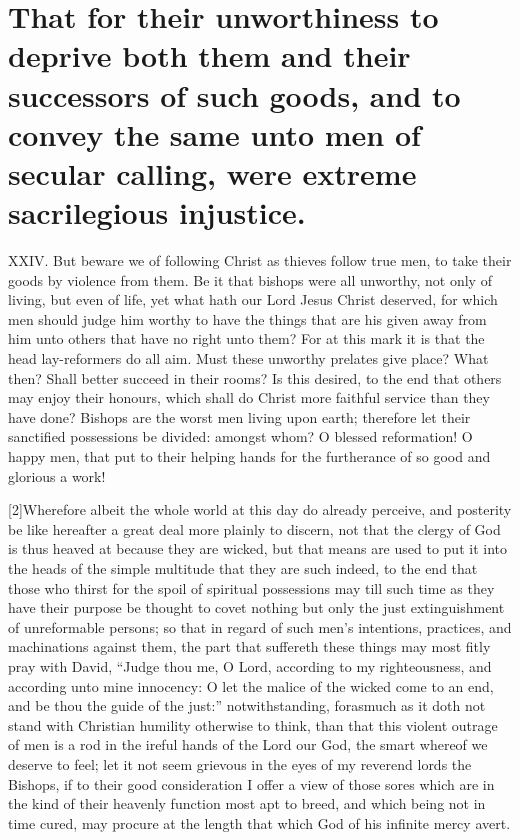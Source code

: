 \section*{That for their unworthiness to deprive both them and their successors of such goods, and to convey the same unto men of secular calling, were extreme sacrilegious injustice.}

XXIV. But beware we of following Christ as thieves follow true men, to take their goods by violence from them. Be it that bishops were all unworthy, not only of living, but even of life, yet what hath our Lord Jesus Christ deserved, for which men should judge him worthy to have the things that are his given away from him unto others that have no right unto them? For at this mark it is that the head lay-reformers do all aim. Must these unworthy prelates give place? What then? Shall better succeed in their rooms? Is this desired, to the end that others may enjoy their honours, which shall do Christ more faithful service than they have done? Bishops are the worst men living upon earth; therefore let their sanctified possessions be divided: amongst whom? O blessed reformation! O happy men, that put to their helping hands for the furtherance of so good and glorious a work!

[2]Wherefore albeit the whole world at this day do already perceive, and posterity be like hereafter a great deal more plainly to discern, not that the clergy of God is thus heaved at because they are wicked, but that means are used to put it into the heads of the simple multitude that they are such indeed, to the end that those who thirst for the spoil of spiritual possessions may till such time as they have their  purpose be thought to covet nothing but only the just extinguishment of unreformable persons; so that in regard of such men’s intentions, practices, and machinations against them, the part that suffereth these things may most fitly pray with David, “Judge thou me, O Lord, according to my righteousness, and according unto mine innocency: O let the malice of the wicked come to an end, and be thou the guide of the just:” notwithstanding, forasmuch as it doth not stand with Christian humility otherwise to think, than that this violent outrage of men is a rod in the ireful hands of the Lord our God, the smart whereof we deserve to feel; let it not seem grievous in the eyes of my reverend lords the Bishops, if to their good consideration I offer a view of those sores which are in the kind of their heavenly function most apt to breed, and which being not in time cured, may procure at the length that which God of his infinite mercy avert.

